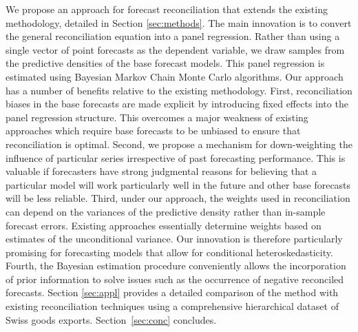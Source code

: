 \documentclass[a4paper,fleqn,11pt]{article}
\begin{document}
We propose an approach for forecast reconciliation that extends the existing methodology, detailed in Section \ref{sec:methods}. The main innovation is to convert the general reconciliation equation into a panel regression. Rather than using a single vector of point forecasts as the dependent variable, we draw samples from the predictive densities of the base forecast models. This panel regression is estimated using Bayesian Markov Chain Monte Carlo algorithms. Our approach has a number of benefits relative to the existing methodology. First, reconciliation biases in the base forecasts are made explicit by introducing fixed effects into the panel regression structure. This overcomes a major weakness of existing approaches which require base forecasts to be unbiased to ensure that reconciliation is optimal. Second, we propose a mechanism for down-weighting the influence of particular series irrespective of past forecasting performance. This is valuable if forecasters have strong judgmental reasons for believing that a particular model will work particularly well in the future and other base forecasts will be less reliable. Third, under our approach, the weights used in reconciliation can depend on the variances of the predictive density rather than in-sample forecast errors. Existing approaches essentially determine weights based on estimates of the unconditional variance. Our innovation is therefore particularly promising for forecasting models that allow for conditional heteroskedasticity. Fourth, the Bayesian estimation procedure conveniently allows the incorporation of prior information to solve issues such as the occurrence of negative reconciled forecasts. Section \ref{sec:appl} provides a detailed comparison of the method with existing reconciliation techniques using a comprehensive hierarchical dataset of Swiss goods exports. Section~\ref{sec:conc} concludes.

\clearpage
\end{document}
